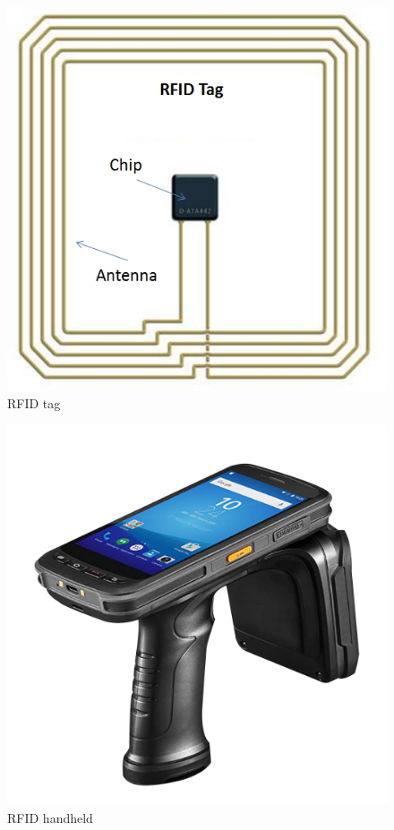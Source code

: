 \begin{figure}
    \includegraphics[width=\linewidth]{RFID.jpg}
    \caption{RFID tag}
    \label{fig:rfidtag}
\end{figure}

\begin{figure}
    \includegraphics[width=\linewidth]{handheld.png}
    \caption{RFID handheld}
    \label{fig:rfidhandheld}
\end{figure}

